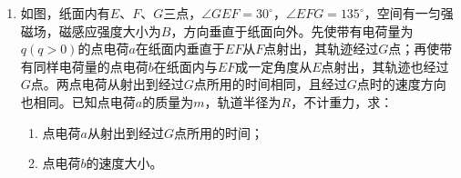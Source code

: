 \begin{enumerate}[leftmargin=0em]
\newpage
\item
{}
如图，纸面内有$ E $、$ F $、$ G $三点，$ \angle GEF=30 ^{\circ} $，$ \angle EFG=135 ^{\circ} $，空间有一匀强磁场，磁感应强度大小为$ B $，方向垂直于纸面向外。先使带有电荷量为$ q(q>0) $的点电荷$ a $在纸面内垂直于$ EF $从$ F $点射出，其轨迹经过$ G $点；再使带有同样电荷量的点电荷$ b $在纸面内与$ EF $成一定角度从$ E $点射出，其轨迹也经过$ G $点。两点电荷从射出到经过$ G $点所用的时间相同，且经过$ G $点时的速度方向也相同。已知点电荷$ a $的质量为$ m $，轨道半径为$ R $，不计重力，求：
\begin{enumerate}
\renewcommand{\labelenumi}{\arabic{enumi}.}
\item
点电荷$ a $从射出到经过$ G $点所用的时间；
\item 
点电荷$ b $的速度大小。



\end{enumerate}
\begin{figure}[h!]
\flushright

\end{figure}





\end{enumerate}
